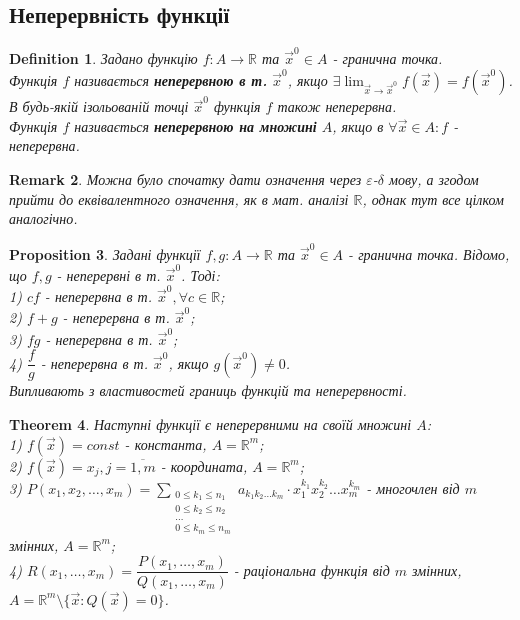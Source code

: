 \documentclass[a4paper, 10pt]{article}
\def\huge{\displaystyle}
\theoremstyle{theoremdd}
\newtheorem{theorem}{Theorem}[subsection]
\theoremstyle{theoremdd}
\theoremstyle{theoremdd}
\newtheorem{definition}[theorem]{Definition}
\theoremstyle{theoremdd}
\theoremstyle{theoremdd}
\theoremstyle{theoremdd}
\newtheorem{proposition}[theorem]{Proposition}
\theoremstyle{theoremdd}
\newtheorem{remark}[theorem]{Remark}
\theoremstyle{theoremdd}
\theoremstyle{theoremdd}
\begin{document}
\subsection{Неперервність функції}
\begin{definition}
Задано функцію $f: A \to \mathbb{R}$ та $\vec{x}^0 \in A$ - гранична точка.\\
Функція $f$ називається \textbf{неперервною в т.} $\vec{x}^0$, якщо $\exists \huge \lim_{\vec{x} \to \vec{x}^0} f(\vec{x}) = f(\vec{x}^0)$. В будь-якій ізольованій точці $\vec{x}^0$ функція $f$ також неперервна.\\
Функція $f$ називається \textbf{неперервною на множині} $A$, якщо в $\forall \vec{x} \in A: f$ - неперервна.
\end{definition}

\begin{remark}
Можна було спочатку дати означення через $\varepsilon$-$\delta$ мову, а згодом прийти до еквівалентного означення, як в мат. аналізі $\mathbb{R}$, однак тут все цілком аналогічно.
\end{remark}

\begin{proposition}
Задані функції $f,g: A \to \mathbb{R}$ та $\vec{x}^0 \in A$ - гранична точка. Відомо, що $f,g$ - неперервні в т. $\vec{x}^0$. Тоді:\\
1) $cf$ - неперервна в т. $\vec{x}^0, \forall c \in \mathbb{R}$;\\
2) $f+g$ - неперервна в т. $\vec{x}^0$;\\
3) $fg$ - неперервна в т. $\vec{x}^0$;\\
4) $\dfrac{f}{g}$ - неперервна в т. $\vec{x}^0$, якщо $g(\vec{x}^0) \neq 0$.\\
\textit{Випливають з властивостей границь функцій та неперервності.}
\end{proposition}

\begin{theorem}
Наступні функції є неперервними на своїй множині $A$:\\
1) $f(\vec{x}) = const$ - константа, $A=\mathbb{R}^m$;\\
2) $f(\vec{x}) = x_j, j = \overline{1,m}$ - координата, $A=\mathbb{R}^m$;\\
3) $P(x_1,x_2,\dots,x_m) = \huge\sum_{\substack{0 \leq k_1 \leq n_1 \\ 0 \leq k_2 \leq n_2 \\ \dots \\ 0 \leq k_m \leq n_m}} a_{k_1 k_2 \dots k_m} \cdot x_1^{k_1} x_2^{k_2} \dots x_m^{k_m}$ - многочлен від $m$ змінних, $A=\mathbb{R}^m$;\medskip\\
4) $R(x_1,\dots,x_m) = \dfrac{P(x_1,\dots,x_m)}{Q(x_1,\dots,x_m)}$ - раціональна функція від $m$ змінних, $A = \mathbb{R}^m \setminus \{\vec{x}: Q(\vec{x}) = 0 \}$.
\end{theorem}
\end{document}
